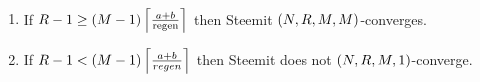 \begin{theorem}
  \label{theorem:convergence:steem} \
  \begin{enumerate}
    \item \label{theorem:case:manyrounds} If $\rounds - 1 \geq \left(\postlen -
    1\right) \ceil*{\frac{a+b}{\regen}}$ then Steemit $\left(\playerlen,
    \rounds, \postlen, \postlen\right)$-converges.
    \item \label{theorem:case:fewrounds} If $\rounds - 1 < \left(\postlen -
    1\right) \ceil*{\frac{a+b}{regen}}$ then Steemit does not $\left(\playerlen,
    \rounds,\postlen, 1\right)$-converge.
  \end{enumerate}
\end{theorem}
